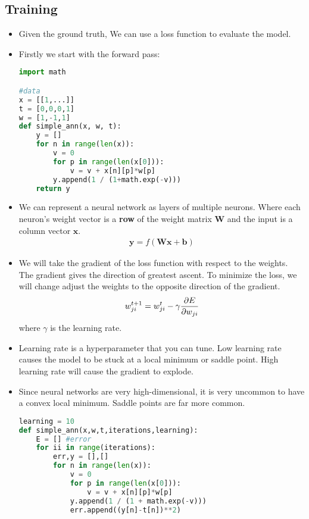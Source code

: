 \documentclass[a4paper]{article}
\numberwithin{equation}{section}
\begin{document}
\subsection{Training}
\begin{itemize}
    \item Given the ground truth, We can use a loss function to evaluate the model.
    \item Firstly we start with the forward pass:
    \begin{lstlisting}[language=Python]
import math

#data
x = [[1,...]]
t = [0,0,0,1]
w = [1,-1,1]
def simple_ann(x, w, t):
    y = []
    for n in range(len(x)):
        v = 0
        for p in range(len(x[0])):
            v = v + x[n][p]*w[p]
        y.append(1 / (1+math.exp(-v)))
    return y
    \end{lstlisting}
    \item We can represent a neural network as layers of multiple neurons. Where each neuron's weight vector is a \textbf{row} of the weight matrix $\mathbf{W}$ and the input is a column vector $\mathbf{x}$.
    \begin{align}
        \mathbf{y} = f(\mathbf{Wx}+\mathbf{b})
    \end{align}
    \item We will take the gradient of the loss function with respect to the weights. The gradient gives the direction of greatest ascent. To minimize the loss, we will change adjust the weights to the opposite direction of the gradient.
    \begin{equation}
        w_{ji}^{t+1}=w_{ji}^t-\gamma\partialderivative{E}{w_{ji}}
    \end{equation}
    where $\gamma$ is the learning rate.
    \item Learning rate is a hyperparameter that you can tune. Low learning rate causes the model to be stuck at a local minimum or saddle point. High learning rate will cause the gradient to explode.
    \item Since neural networks are very high-dimensional, it is very uncommon to have a convex local minimum. Saddle points are far more common.
    \begin{lstlisting}[language=Python]
learning = 10
def simple_ann(x,w,t,iterations,learning):
    E = [] #error
    for ii in range(iterations):
        err,y = [],[]
        for n in range(len(x)):
            v = 0
            for p in range(len(x[0])):
                v = v + x[n][p]*w[p]
            y.append(1 / (1 + math.exp(-v)))
            err.append((y[n]-t[n])**2)


\end{lstlisting}
\end{itemize}
\end{document}
